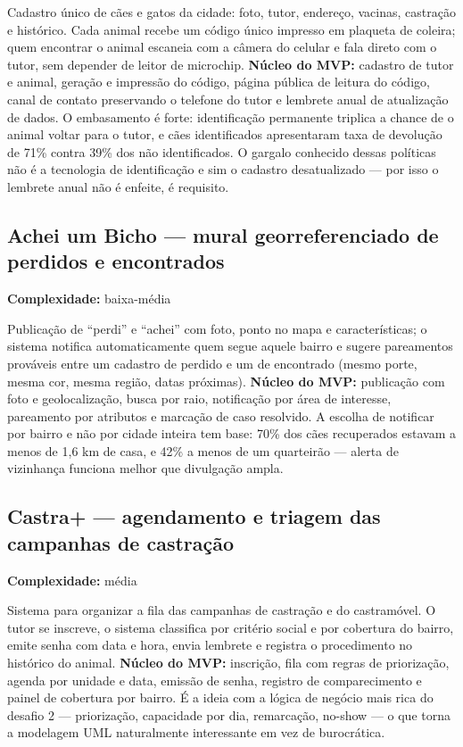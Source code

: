 \documentclass[11pt,a4paper]{article}
\newcommand{\complex}[1]{{\small\color{cinza}\textbf{Complexidade:} #1}}
\begin{document}
Cadastro único de cães e gatos da cidade: foto, tutor, endereço, vacinas, castração e histórico.
Cada animal recebe um código único impresso em plaqueta de coleira; quem encontrar o animal
escaneia com a câmera do celular e fala direto com o tutor, sem depender de leitor de microchip.
\textbf{Núcleo do MVP:} cadastro de tutor e animal, geração e impressão do código, página pública
de leitura do código, canal de contato preservando o telefone do tutor e lembrete anual de
atualização de dados. O embasamento é forte: identificação permanente triplica a chance de o animal
voltar para o tutor, e cães identificados apresentaram taxa de devolução de 71\% contra 39\% dos não
identificados. O gargalo conhecido dessas políticas não é a tecnologia de identificação e sim o
cadastro desatualizado --- por isso o lembrete anual não é enfeite, é requisito.

\subsection{Achei um Bicho --- mural georreferenciado de perdidos e encontrados}
\complex{baixa-média}

Publicação de ``perdi'' e ``achei'' com foto, ponto no mapa e características; o sistema notifica
automaticamente quem segue aquele bairro e sugere pareamentos prováveis entre um cadastro de perdido
e um de encontrado (mesmo porte, mesma cor, mesma região, datas próximas). \textbf{Núcleo do MVP:}
publicação com foto e geolocalização, busca por raio, notificação por área de interesse, pareamento
por atributos e marcação de caso resolvido. A escolha de notificar por bairro e não por cidade
inteira tem base: 70\% dos cães recuperados estavam a menos de 1,6 km de casa, e 42\% a menos de um
quarteirão --- alerta de vizinhança funciona melhor que divulgação ampla.

\subsection{Castra+ --- agendamento e triagem das campanhas de castração}
\complex{média}

Sistema para organizar a fila das campanhas de castração e do castramóvel. O tutor se inscreve, o
sistema classifica por critério social e por cobertura do bairro, emite senha com data e hora,
envia lembrete e registra o procedimento no histórico do animal. \textbf{Núcleo do MVP:} inscrição,
fila com regras de priorização, agenda por unidade e data, emissão de senha, registro de
comparecimento e painel de cobertura por bairro. É a ideia com a lógica de negócio mais rica do
desafio 2 --- priorização, capacidade por dia, remarcação, no-show --- o que torna a modelagem UML
naturalmente interessante em vez de burocrática.
\end{document}
